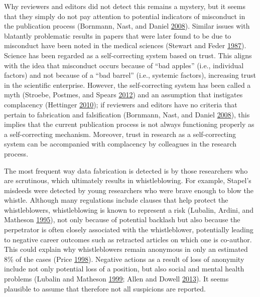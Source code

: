 \documentclass[a5paper]{book}
\begin{document}
Why reviewers and editors did not detect this remains a mystery, but it
seems that they simply do not pay attention to potential indicators of
misconduct in the publication process (Bornmann, Nast, and Daniel
\protect\hyperlink{ref-doi:10.1007ux2fs11192-007-1950-2}{2008}). Similar
issues with blatantly problematic results in papers that were later
found to be due to misconduct have been noted in the medical sciences
(Stewart and Feder
\protect\hyperlink{ref-doi:10.1038ux2f325207a0}{1987}). Science has been
regarded as a self-correcting system based on trust. This aligns with
the idea that misconduct occurs because of \enquote{bad apples} (i.e.,
individual factors) and not because of a \enquote{bad barrel} (i.e.,
systemic factors), increasing trust in the scientific enterprise.
However, the self-correcting system has been called a myth (Stroebe,
Postmes, and Spears
\protect\hyperlink{ref-doi:10.1177ux2f1745691612460687}{2012}) and an
assumption that instigates complacency (Hettinger
\protect\hyperlink{ref-doi:10.1038ux2f4661040b}{2010}); if reviewers and
editors have no criteria that pertain to fabrication and falsification
(Bornmann, Nast, and Daniel
\protect\hyperlink{ref-doi:10.1007ux2fs11192-007-1950-2}{2008}), this
implies that the current publication process is not always functioning
properly as a self-correcting mechanism. Moreover, trust in research as
a self-correcting system can be accompanied with complacency by
colleagues in the research process.

The most frequent way data fabrication is detected is by those
researchers who are scrutinous, which ultimately results in
whistleblowing. For example, Stapel's misdeeds were detected by young
researchers who were brave enough to blow the whistle. Although many
regulations include clauses that help protect the whistleblowers,
whistleblowing is known to represent a risk (Lubalin, Ardini, and
Matheson \protect\hyperlink{ref-lubalin1995}{1995}), not only because of
potential backlash but also because the perpetrator is often closely
associated with the whistleblower, potentially leading to negative
career outcomes such as retracted articles on which one is co-author.
This could explain why whistleblowers remain anonymous in only an
estimated 8\% of the cases (Price
\protect\hyperlink{ref-doi:10.1097ux2f00001888-199805000-00009}{1998}).
Negative actions as a result of loss of anonymity include not only
potential loss of a position, but also social and mental health problems
(Lubalin and Matheson
\protect\hyperlink{ref-doi:10.1007ux2fs11948-999-0014-9}{1999}; Allen
and Dowell
\protect\hyperlink{ref-doi:10.1080ux2f08989621.2013.822249}{2013}). It
seems plausible to assume that therefore not all suspicions are
reported.
\end{document}
